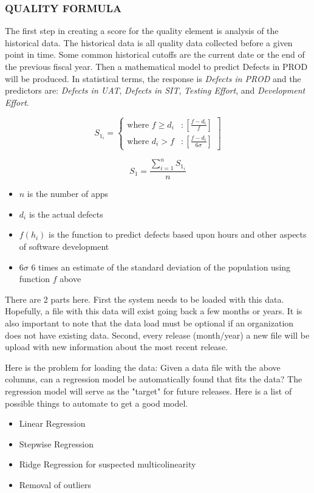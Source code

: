 \documentclass[SDSUThesis.tex]{subfiles}
\begin{document}
    \subsubsection{QUALITY FORMULA}
        The first step in creating a score for the quality
        element is analysis of the historical data.  The historical
        data is all quality data collected before  a given point
        in time.  Some common historical cutoffs are the current date
        or the end of the previous fiscal year.  Then a mathematical
        model to predict Defects in PROD will be produced.  In statistical
        terms, the response is \textit{Defects in PROD} and the predictors
        are: \textit{Defects in UAT}, \textit{Defects in SIT}, 
        \textit{Testing Effort}, and \textit{Development Effort}.  
    

\begin{displaymath}
   S_{1_i} = \left\{
     \begin{array}{lr}
       \text{where } f \geq d_i & : \left[ \frac{f - d_i}{f} \right] \\
       \text{where } d_i > f  & : \left[ \frac{f-d_i }{6\sigma} \right]
     \end{array}
   \right]
\end{displaymath} 

\[
    S_{1} = \frac{\sum^n_{i=1} S_{1_i}}{n}
\]
\begin{itemize}
\item $n$ is the number of apps
\item $d_i$ is the actual defects
\item $f(h_i)$ is the function to predict defects based upon hours and other aspects of software development
\item $6\sigma$ 6 times an estimate of the standard deviation of the population using function $f$ above
\end{itemize}

There are 2 parts here.  First the system needs to be loaded with this data.  Hopefully,
a file with this data will exist going back a few months or years.  It is also important
to note that the data load must be optional if an organization does not have existing
data.  Second, every release (month/year) a new file will be upload with new information
about the most recent release.

Here is the problem for loading the data:
Given a data file with the above columns, can a regression model be automatically found
that fits the data?  The regression model will serve as the "target" for future 
releases.  Here is a list of possible things to automate to get a good model.
\begin{itemize}
\item Linear Regression
\item Stepwise Regression
\item Ridge Regression for suspected multicolinearity
\item Removal of outliers
\end{itemize}
\end{document}
